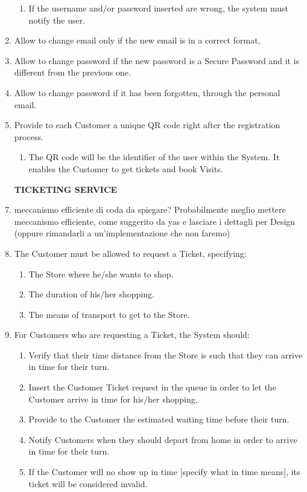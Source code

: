 \documentclass[a4paper, 10pt, oneside]{article}
\newcommand*{\lorenzo}[1]{\textcolor{BurntOrange}{#1}}
\begin{document}
\begin{enumerate}[align=left]
\begin{enumerate}[label={-}]
        \item If the username and/or password inserted are wrong, the system must notify the user.
    \end{enumerate}
    \item Allow to change email only if the new email is in a correct format, 
    \item Allow to change password if the new password is a Secure Password and it is different from the previous one.
    \item Allow to change password if it has been forgotten, through the personal email.
    \item Provide to each Customer a unique QR code \lorenzo{right after the registration process}.
    \begin{enumerate}[label={-}]
        \item \lorenzo{The QR code will be the identifier of the user within the System. It enables the Customer to get tickets and book Visits.}
    \end{enumerate}
    
    \item[\textbf{TICKETING SERVICE}]
    \item \lorenzo{meccanismo efficiente di coda da spiegare? Probabilmente meglio mettere meccanismo efficiente, come suggerito da yas e lasciare i dettagli per Design (oppure rimandarli a un'implementazione che non faremo)}
    \item The Customer must be allowed to request a Ticket, specifying:
     \begin{enumerate}[label={-}]
        \item The Store where he/she wants to shop.
        \item The duration of his/her shopping.
        \item The means of transport to get to the Store.
    \end{enumerate}
    \item For Customers who are requesting a Ticket, the System should:
    \begin{enumerate}[label={-}]
        \item Verify that their time distance from the Store is such that they can arrive in time for their turn.
        \item Insert the Customer Ticket request in the queue in order to let the Customer arrive in time for his/her shopping.
        \item Provide to the Customer the estimated waiting time before their turn.
        \item Notify Customers when they should depart from home in order to arrive in time for their turn.
        \item \lorenzo{If the Customer will no show up in time [specify what in time means], its ticket will be considered invalid.}
    \end{enumerate}
    

\end{enumerate}
\end{document}
